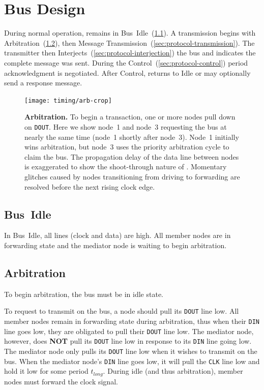 \section{Bus Design}
\label{sec:protocol}
During normal operation, \bus remains in Bus~Idle~(\ref{sec:protocol-idle}).
A transmission begins with Arbitration~(\ref{sec:protocol-arbitration}), then
Message Transmission~(\ref{sec:protocol-transmission}). The transmitter then
Interjects~(\ref{sec:protocol-interjection}) the bus and indicates the complete
message was sent. During the Control~(\ref{sec:protocol-control}) period
acknowledgment is negotiated. After Control, \bus returns to Idle or may
optionally send a response message.

\begin{figure}[h!]
  \centering
  \texttt{[image: timing/arb-crop]}
  \caption{\textbf{\bus Arbitration.} \textmd{
    To begin a transaction, one or more nodes pull down on {\tt DOUT}.
    Here we show node~1 and node~3 requesting the bus at nearly the same time
    (node~1 shortly after node~3). Node~1 initially wins arbitration, but
    node~3 uses the priority arbitration cycle to claim the bus. The
    propagation delay of the data line between nodes is exaggerated to show
    the shoot-through nature of \bus. Momentary glitches caused by nodes
    transitioning from driving to forwarding are resolved before the next
    rising clock edge.
  }}
  \label{fig:arbitration}
\end{figure}

\subsection{Bus~Idle}
\label{sec:protocol-idle}
In \bus Bus~Idle, all lines (clock and data) are high. All member nodes are in
forwarding state and the mediator node is waiting to begin arbitration.

\subsection{Arbitration}
\label{sec:protocol-arbitration}
To begin arbitration, the bus must be in idle state.

To request to transmit on the bus, a node should pull its {\tt DOUT} line low.
All member nodes remain in forwarding state during arbitration, thus when
their {\tt DIN} line goes low, they are obligated to pull their {\tt DOUT}
line low. The mediator node, however, does {\bf NOT} pull its {\tt DOUT} line
low in response to its {\tt DIN} line going low. The mediator node only pulls
its {\tt DOUT} line low when it wishes to transmit on the bus. When the
mediator node's {\tt DIN} line goes low, it will pull the {\tt CLK} line low
and hold it low for some period $t_{long}$. During {\sc idle} (and thus
arbitration), member nodes must forward the clock signal.

